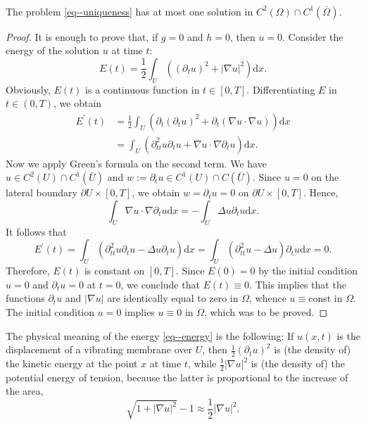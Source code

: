 \documentclass[11pt]{article}
\begin{document}
				\begin{thm}
					\phantom{k}\\ The problem \eqref{eq--uniqueness} has at most one solution in $C^2(\Omega)\cap C^1(\bar{\Omega})$.
				\end{thm}
				\begin{proof}
					It is enough to prove that, if $g=0$ and $h=0$, then $u=0$. Consider the energy of the solution $u$ at time $t$:
					\begin{equation}\label{eq--energy}
						E(t)=\frac{1}{2}\int_U((\partial_tu)^2+|\nabla u|^2)\mathrm{d}x.
					\end{equation}
					Obviously, $E(t)$  is a continuous function in $t\in[0,T]$. Differentiating $E$ in $t\in(0,T)$, we obtain
					\begin{align*}
						E^\prime(t)&=\frac{1}{2}\int_U\left(\partial_t(\partial_tu)^2+\partial_t(\nabla u\cdot\nabla u)\right)\mathrm{d}x\\
						&=\int_U(\partial_{tt}^2u\partial_tu+\nabla u\cdot\nabla\partial_tu)\mathrm{d}x.
					\end{align*}
					Now we apply Green's formula on the second term. We have $u\in C^2(U)\cap C^1(\bar{U})$ and $w:=\partial_tu\in C^1(U)\cap C(\bar{U})$. Since $u=0$ on the lateral boundary $\partial U\times[0,T]$, we obtain $w=\partial_tu=0$ on $\partial U\times[0,T]$. Hence,
					\begin{equation*}
						\int_U\nabla u\cdot\nabla\partial_tu \mathrm{d}x=-\int_U\Delta u\partial_tu \mathrm{d}x.
					\end{equation*}
					It follows that
					\begin{equation*}
						E^\prime(t)=\int_U\left(\partial_{tt}^2u\partial_tu-\Delta u\partial_tu\right)\mathrm{d}x=\int_U(\partial_{tt}^2u-\Delta u)\partial_tu \mathrm{d}x=0.
					\end{equation*}
					Therefore, $E(t)$ is constant on $[0,T]$. Since $E(0)=0$ by the initial condition $u=0$ and $\partial_tu=0$ at $t=0$, we conclude that $E(t)\equiv0$. This implies that the functions $\partial_tu$ and $|\nabla u|$ are identically equal to zero in $\Omega$, whence $u\equiv$const in $\Omega$. The initial condition $u=0$ implies $u\equiv0$ in $\Omega$, which was to be proved.
				\end{proof}

				The physical meaning of the energy \eqref{eq--energy} is the following: If $u(x,t)$ is the displacement of a vibrating membrane over $U$, then $\frac{1}{2}(\partial_tu)^2$ is (the density of) the kinetic energy at the point $x$ at time $t$, while $\frac{1}{2}|\nabla u|^2$ is (the density of) the potential energy of tension, because the latter is proportional to the increase of the area,
				\begin{equation*}
					\sqrt{1+|\nabla u|^2}-1\approx\frac{1}{2}|\nabla u|^2.
				\end{equation*}
				
\end{document}
